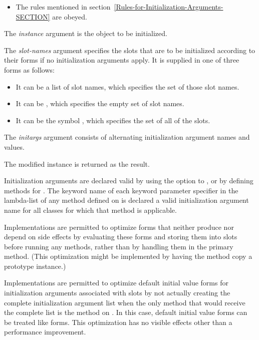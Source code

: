 \begin{defun}
\begin{itemize}
\item  The rules mentioned in section~\ref{Rules-for-Initialization-Arguments-SECTION} are obeyed.

\end{itemize}





The \emph{instance\/} argument is the object to be initialized.

The \emph{slot-names\/} argument specifies the slots that are to be
initialized according to their  forms if no
initialization arguments apply.  It is supplied in one of three forms
as follows:

\begin{itemize}

\item  It can be a list of slot names, which specifies
the set of those slot names.

\item  It can be , which specifies the empty set of
slot names.

\item  It can be the symbol , which specifies the set of
all of the slots.

\end{itemize}

The \emph{initargs\/} argument consists of alternating initialization 
argument names and values.


The modified instance is returned as the result.


Initialization arguments are declared valid by using the 
 option to , or by defining methods for 
.  The keyword name of each keyword parameter
specifier in the lambda-list of any method defined on 
 is declared a valid initialization argument
name for all classes for which that method is applicable.

Implementations are permitted to optimize  forms that 
neither produce nor depend on side effects by evaluating these forms
and storing them into slots before running any 
 methods, rather than by handling them in the
primary  method.  (This optimization might
be implemented by having the  method copy a
prototype instance.)

Implementations are permitted to optimize default initial value forms
for initialization arguments associated with slots by not actually
creating the complete initialization argument list when the only method
that would receive the complete list is the method on 
.  In this case, default initial value forms can be 
treated like  forms.  This optimization has no visible
effects other than a performance improvement.


\end{defun}
